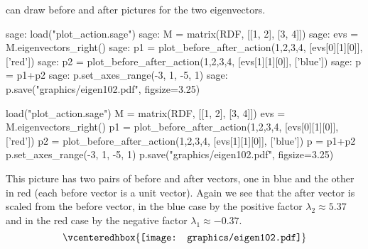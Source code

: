 \Sage{} can draw before and after pictures for the two eigenvectors.
\begin{sagecommandline}
sage: load("plot_action.sage")  
sage: M = matrix(RDF, [[1, 2], [3, 4]])
sage: evs = M.eigenvectors_right()  
sage: p1 = plot_before_after_action(1,2,3,4, [evs[0][1][0]], ['red']) 
sage: p2 = plot_before_after_action(1,2,3,4, [evs[1][1][0]], ['blue']) 
sage: p = p1+p2
sage: p.set_axes_range(-3, 1, -5, 1) 
sage: p.save("graphics/eigen102.pdf", figsize=3.25)
\end{sagecommandline}
\begin{sagesilent}
load("plot_action.sage")  
M = matrix(RDF, [[1, 2], [3, 4]])
evs = M.eigenvectors_right()  
p1 = plot_before_after_action(1,2,3,4, [evs[0][1][0]], ['red']) 
p2 = plot_before_after_action(1,2,3,4, [evs[1][1][0]], ['blue']) 
p = p1+p2
p.set_axes_range(-3, 1, -5, 1) 
p.save("graphics/eigen102.pdf", figsize=3.25)
\end{sagesilent}
\noindent
This picture has two pairs of before and after vectors, one in blue
and the other in red
(each before vector is a unit vector).
Again we see that 
the after vector is scaled from the before vector, 
in the blue case by the positive factor $\lambda_2\approx 5.37$ and
in the red case by the negative factor $\lambda_1\approx -0.37$.
\begin{equation*}
  \vcenteredhbox{\texttt{[image: graphics/eigen102.pdf]}}
\end{equation*}



